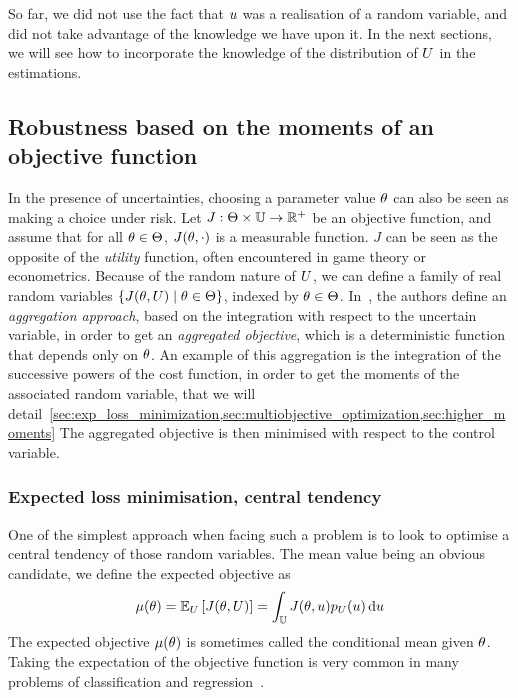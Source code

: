 \documentclass[../../Main_ManuscritThese.tex]{subfiles}
\begin{document}
So far, we did not use the fact that $u$ was a realisation of a
random variable, and did not take advantage of the knowledge we have
upon it. In the next sections, we will see how to incorporate the
knowledge of the distribution of $U$ in the estimations.

\subsection{Robustness based on the moments of an objective function}
In the presence of uncertainties, choosing a parameter value $\theta$ can
also be seen as making a choice under risk. Let
$J:\Theta \times \mathbb{U}\rightarrow \mathbb{R}^+$ be an objective
function, and assume that for all $\theta \in \Theta$, $J(\theta, \cdot)$
is a measurable function.  $J$ can be seen as the opposite of the
\emph{utility} function, often encountered in game theory or
econometrics.  Because of the random nature of $U$, we can define a
family of real random variables $\{J(\theta,U) \mid \theta \in \Theta\}$,
indexed by $\theta \in \Theta$.  In~\cite{beyer_robust_2007}, the
authors define an \emph{aggregation approach}, based on the
integration with respect to the uncertain variable, in order to get an
\emph{aggregated objective}, which is a deterministic function that
depends only on $\theta$.  An example of this aggregation is the
integration of the successive powers of the cost function, in order to
get the moments of the associated random variable, that we will
detail~\cref{sec:exp_loss_minimization,sec:multiobjective_optimization,sec:higher_moments} %
The aggregated objective is then minimised with respect to the control
variable.
\subsubsection{Expected loss minimisation, central tendency}
\label{sec:exp_loss_minimization}
One of the simplest approach when facing such a problem is to look to
optimise a central tendency of those random variables. The mean value
being an obvious candidate, we define the expected objective as
\begin{equation}
  \label{eq:mean_objective}
  \mu(\theta) = \mathbb{E}_U\left[J(\theta,U)\right] =\int_{\mathbb{U}} J(\theta,u)p_U(u)\,\mathrm{d}u
\end{equation}
The expected objective $\mu(\theta)$ is sometimes called the conditional
mean given $\theta$. Taking the expectation of the objective function is
very common in many problems of classification and
regression~\citep{bishop_pattern_2006}.
\end{document}
